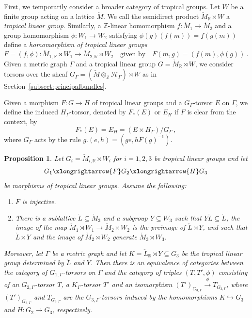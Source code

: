 \documentclass[10pt, a4paper]{amsart}
\newtheorem{proposition}[theorem]{Proposition}
\theoremstyle{definition}
\theoremstyle{myitemstyle}
\newcommand{\R}{\mathbb{R}}
\newcommand{\ZZ}{\mathbb{Z}}
\newcommand{\RR}{\mathbb{R}}
\newcommand{\Mcheck}{{\check{M}}}
\newcommand{\calH}{\mathcal{H}}
\newcommand{\Ga}{\Gamma}
\begin{document}
First, we temporarily consider a broader category of tropical groups. Let $W$ be a finite group acting on a lattice $\Mcheck$. We call the semidirect product $\Mcheck_{\RR}\rtimes W$ a \emph{tropical linear group}. Similarly, a $\ZZ$-linear homomorphism $f:\Mcheck_1\to \Mcheck_2$ and a group homomorphism $\phi:W_1\to W_2$ satisfying $\phi(g)(f(m))=f(g(m))$ define a \emph{homomorphism of tropical linear groups}
\[
F=(f,\phi):\Mcheck_{1,\RR}\rtimes W_1 \to \Mcheck_{2,\RR}\rtimes W_2\quad \text{given by} \quad F(m,g)=(f(m),\phi(g)) \ .
\]
Given a metric graph $\Ga$ and a tropical linear group $G=\Mcheck_{\RR}\rtimes W$, we consider torsors over the sheaf $G_{\Ga}=(\Mcheck\otimes_{\ZZ}\calH_{\Ga})\rtimes W$ as in Section~\ref{subsect:principalbundles}.

Given a morphism $F\colon G\to H$ of tropical linear groups and a $G_\Ga$-torsor $E$ on $\Gamma$, we define the induced $H_\Ga$-torsor, denoted by $F_*(E)$ or $E_H$ if $F$ is clear from the context, by 
\[
    F_*(E)=E_H=(E\times H_{\Gamma})/G_{\Gamma} \ ,
\]
where $G_{\Gamma}$ acts by the rule $g.(e,h)=(ge,hF(g)^{-1})$. 




\begin{proposition}
\label{prop:fiber product of neutral gerbes}
    Let $G_i=\Mcheck_{i,\R}\rtimes W_i$ for $i=1,2,3$ be tropical linear groups and let 
    \[  
        G_1 \xlongrightarrow{F}
            G_2 \xlongrightarrow{H}
                G_3  
    \]
    be morphisms of tropical linear groups. Assume the following:
    \begin{enumerate}
        \item $F$ is injective.
        \item There is a sublattice $\check{L}\subseteq \Mcheck_3$ and a subgroup $Y\subseteq W_3$ such that $Y\check L\subseteq \check L$, the image of the map $\Mcheck_1\rtimes W_1\to \Mcheck_2\rtimes W_2$ is the preimage of $\check{L}\rtimes Y$, and such that $\check{L}\rtimes Y$ and the image of $\Mcheck_2\rtimes W_2$  generate $\Mcheck_3\rtimes W_3$.
        

    \end{enumerate}
       Moreover, let $\Gamma$ be a metric graph and let $K=\check L_{\RR}\rtimes Y\subseteq G_3$ be the tropical linear group determined by $\check{L}$ and $Y$. Then there is an equivalence of categories between the category of $G_{1,\Gamma}$-torsors on $\Gamma$ and the category of triples $(T, T', \phi)$ consisting of an $G_{2,\Gamma}$-torsor $T$, a $K_\Gamma$-torsor $T'$ and an isomorphism $(T')_{G_{3,\Gamma}}\xrightarrow{\phi} T_{G_{3,\Gamma}}$, where $(T')_{G_{3,\Gamma}}$ and $T_{G_{3,\Gamma}}$ are the $G_{3,\Gamma}$-torsors induced by the homomorphisms $K\hookrightarrow G_3$ and $H:G_2\to G_3$, respectively.
\end{proposition}
\end{document}
